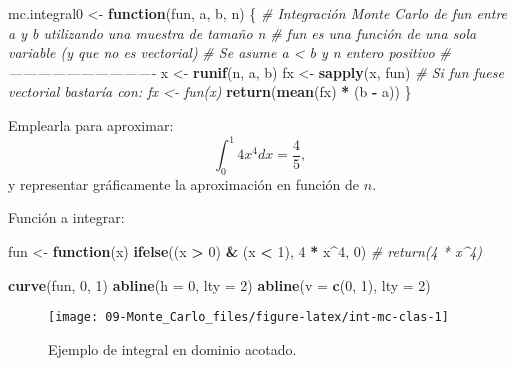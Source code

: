 \documentclass[
]{book}
\newenvironment{Shaded}{\begin{snugshade}}{\end{snugshade}}
\newcommand{\CommentTok}[1]{\textcolor[rgb]{0.56,0.35,0.01}{\textit{#1}}}
\newcommand{\ControlFlowTok}[1]{\textcolor[rgb]{0.13,0.29,0.53}{\textbf{#1}}}
\newcommand{\DataTypeTok}[1]{\textcolor[rgb]{0.13,0.29,0.53}{#1}}
\newcommand{\DecValTok}[1]{\textcolor[rgb]{0.00,0.00,0.81}{#1}}
\newcommand{\KeywordTok}[1]{\textcolor[rgb]{0.13,0.29,0.53}{\textbf{#1}}}
\newcommand{\NormalTok}[1]{#1}
\newcommand{\OperatorTok}[1]{\textcolor[rgb]{0.81,0.36,0.00}{\textbf{#1}}}
\newcommand{\StringTok}[1]{\textcolor[rgb]{0.31,0.60,0.02}{#1}}
\theoremstyle{break}
\theoremstyle{definition}
\theoremstyle{definition}
\theoremstyle{definition}
\theoremstyle{remark}
\begin{document}
\begin{Shaded}
\begin{Highlighting}[]
\NormalTok{mc.integral0 <-}\StringTok{ }\ControlFlowTok{function}\NormalTok{(fun, a, b, n) \{}
  \CommentTok{# Integración Monte Carlo de fun entre a y b utilizando una muestra de tamaño n}
  \CommentTok{# fun es una función de una sola variable (y que no es vectorial)}
  \CommentTok{# Se asume a < b y n entero positivo}
  \CommentTok{# -------------------------------}
\NormalTok{  x <-}\StringTok{ }\KeywordTok{runif}\NormalTok{(n, a, b)}
\NormalTok{  fx <-}\StringTok{ }\KeywordTok{sapply}\NormalTok{(x, fun) }\CommentTok{# Si fun fuese vectorial bastaría con: fx <- fun(x)}
  \KeywordTok{return}\NormalTok{(}\KeywordTok{mean}\NormalTok{(fx) }\OperatorTok{*}\StringTok{ }\NormalTok{(b }\OperatorTok{-}\StringTok{ }\NormalTok{a))}
\NormalTok{\}}
\end{Highlighting}
\end{Shaded}

Emplearla para aproximar:
\[\int_0^1 4x^4 dx = \frac{4}{5},\]
y representar gráficamente la aproximación en función de \(n\).

Función a integrar:

\begin{Shaded}
\begin{Highlighting}[]
\NormalTok{fun <-}\StringTok{ }\ControlFlowTok{function}\NormalTok{(x) }\KeywordTok{ifelse}\NormalTok{((x }\OperatorTok{>}\StringTok{ }\DecValTok{0}\NormalTok{) }\OperatorTok{&}\StringTok{ }\NormalTok{(x }\OperatorTok{<}\StringTok{ }\DecValTok{1}\NormalTok{), }\DecValTok{4} \OperatorTok{*}\StringTok{ }\NormalTok{x}\OperatorTok{^}\DecValTok{4}\NormalTok{, }\DecValTok{0}\NormalTok{)}
\CommentTok{# return(4 * x^4)}

\KeywordTok{curve}\NormalTok{(fun, }\DecValTok{0}\NormalTok{, }\DecValTok{1}\NormalTok{)}
\KeywordTok{abline}\NormalTok{(}\DataTypeTok{h =} \DecValTok{0}\NormalTok{, }\DataTypeTok{lty =} \DecValTok{2}\NormalTok{)}
\KeywordTok{abline}\NormalTok{(}\DataTypeTok{v =} \KeywordTok{c}\NormalTok{(}\DecValTok{0}\NormalTok{, }\DecValTok{1}\NormalTok{), }\DataTypeTok{lty =} \DecValTok{2}\NormalTok{)}
\end{Highlighting}
\end{Shaded}

\begin{figure}[!htb]

{\centering \texttt{[image: 09-Monte\_Carlo\_files/figure-latex/int-mc-clas-1]} 

}

\caption{Ejemplo de integral en dominio acotado.}\label{fig:int-mc-clas}
\end{figure}
\end{document}

